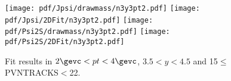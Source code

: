 \begin{figure}[H]
\begin{center}
\texttt{[image: pdf/Jpsi/drawmass/n3y3pt2.pdf]}
\texttt{[image: pdf/Jpsi/2DFit/n3y3pt2.pdf]}
\vspace*{-0.5cm}
\texttt{[image: pdf/Psi2S/drawmass/n3y3pt2.pdf]}
\texttt{[image: pdf/Psi2S/2DFit/n3y3pt2.pdf]}
\vspace*{-0.5cm}
\end{center}
\caption{Fit results in $2\gevc<pt<4\gevc$, $3.5<y<4.5$ and 15$\leq$PVNTRACKS$<$22.}
\label{Fitn3y3pt2}
\end{figure}
